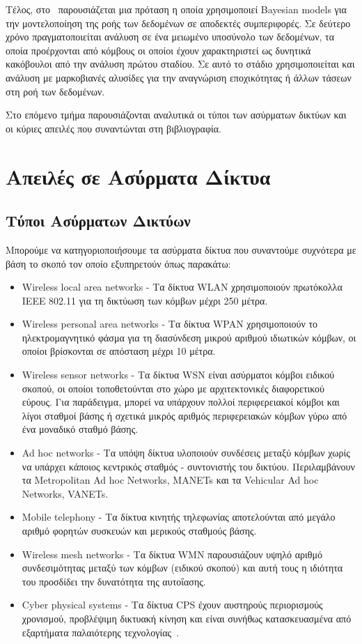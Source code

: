 \documentclass[12pt]{report}
\begin{document}
Τέλος, στο~\cite{paper:11} παρουσιάζεται μια πρόταση η οποία χρησιμοποιεί \textlatin{Bayesian models} για την μοντελοποίηση της ροής των δεδομένων σε αποδεκτές συμπεριφορές. Σε δεύτερο χρόνο πραγματοποιείται ανάλυση σε ένα μειωμένο υποσύνολο των δεδομένων, τα οποία προέρχονται από κόμβους οι οποίοι έχουν χαρακτηριστεί ως δυνητικά κακόβουλοι από την ανάλυση πρώτου σταδίου. Σε αυτό το στάδιο χρησιμοποιείται και ανάλυση με μαρκοβιανές αλυσίδες για την αναγνώριση εποχικότητας ή άλλων τάσεων στη ροή των δεδομένων.

Στο επόμενο τμήμα παρουσιάζονται αναλυτικά οι τύποι των ασύρματων δικτύων και οι κύριες απειλές που συναντώνται στη βιβλιογραφία.

\chapter{Απειλές σε Ασύρματα Δίκτυα}
\section{Τύποι Ασύρματων Δικτύων}
Μπορούμε να κατηγοριοποιήσουμε τα ασύρματα δίκτυα που συναντούμε συχνότερα με βάση το σκοπό τον οποίο εξυπηρετούν όπως παρακάτω:
\begin{itemize}
  \item \textlatin{Wireless local area networks} - Τα δίκτυα \textlatin{WLAN} χρησιμοποιούν πρωτόκολλα \textlatin{IEEE 802.11} για τη δικτύωση των κόμβων μέχρι 250 μέτρα.
  \item \textlatin{Wireless personal area networks} - Τα δίκτυα \textlatin{WPAN} χρησιμοποιούν το ηλεκτρομαγνητικό φάσμα για τη διασύνδεση μικρού αριθμού ιδιωτικών κόμβων, οι οποίοι βρίσκονται σε απόσταση μέχρι 10 μέτρα.
  \item \textlatin{Wireless sensor networks} - Τα δίκτυα \textlatin{WSN} είναι ασύρματοι κόμβοι ειδικού σκοπού, οι οποίοι τοποθετούνται στο χώρο με αρχιτεκτονικές διαφορετικού εύρους. Για παράδειγμα, μπορεί να υπάρχουν πολλοί περιφερειακοί κόμβοι και λίγοι σταθμοί βάσης ή σχετικά μικρός αριθμός περιφερειακών κόμβων γύρω από ένα μοναδικό σταθμό βάσης.
  \item \textlatin{Ad hoc networks} - Τα υπόψη δίκτυα υλοποιούν συνδέσεις μεταξύ κόμβων χωρίς να υπάρχει κάποιος κεντρικός σταθμός - συντονιστής του δικτύου. Περιλαμβάνουν τα \textlatin{Metropolitan Ad hoc Networks, MANETs} και τα \textlatin{Vehicular Ad hoc Networks, VANETs}.
  \item \textlatin{Mobile telephony} - Τα δίκτυα κινητής τηλεφωνίας αποτελούνται από μεγάλο αριθμό φορητών συσκευών και μερικούς σταθμούς βάσης.
  \item \textlatin{Wireless mesh networks} - Τα δίκτυα \textlatin{WMN} παρουσιάζουν υψηλό αριθμό συνδεσιμότητας μεταξύ των κόμβων (ειδικού σκοπού) και αυτή τους η ιδιότητα του προσδίδει την δυνατότητα της αυτοΐασης.
  \item \textlatin{Cyber physical systems} - Τα δίκτυα \textlatin{CPS} έχουν αυστηρούς περιορισμούς χρονισμού, προβλέψιμη δικτυακή κίνηση και είναι συνήθως κατασκευασμένα από εξαρτήματα παλαιότερης τεχνολογίας~\cite{paper:12}.
\end{itemize}
\end{document}
